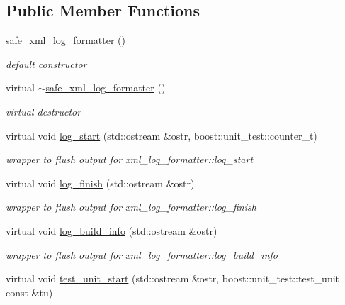 \subsection*{Public Member Functions}
\begin{DoxyCompactItemize}
\item 
\hyperlink{classpion_1_1test_1_1safe__xml__log__formatter_a239efc65e6d0c1f14aae16edc8867664}{safe\-\_\-xml\-\_\-log\-\_\-formatter} ()
\begin{DoxyCompactList}\small\item\em default constructor \end{DoxyCompactList}\item 
virtual \hyperlink{classpion_1_1test_1_1safe__xml__log__formatter_a33953784f10be2a896f44ea81a083a7d}{$\sim$safe\-\_\-xml\-\_\-log\-\_\-formatter} ()
\begin{DoxyCompactList}\small\item\em virtual destructor \end{DoxyCompactList}\item 
virtual void \hyperlink{classpion_1_1test_1_1safe__xml__log__formatter_ad5ecf157f05d08b7a7028c8aeba9b0d7}{log\-\_\-start} (std\-::ostream \&ostr, boost\-::unit\-\_\-test\-::counter\-\_\-t)
\begin{DoxyCompactList}\small\item\em wrapper to flush output for xml\-\_\-log\-\_\-formatter\-::log\-\_\-start \end{DoxyCompactList}\item 
virtual void \hyperlink{classpion_1_1test_1_1safe__xml__log__formatter_ab84589991d45d0301487dde76c748cb2}{log\-\_\-finish} (std\-::ostream \&ostr)
\begin{DoxyCompactList}\small\item\em wrapper to flush output for xml\-\_\-log\-\_\-formatter\-::log\-\_\-finish \end{DoxyCompactList}\item 
virtual void \hyperlink{classpion_1_1test_1_1safe__xml__log__formatter_ac97db50c4d84d7c94145fe18a6ba9223}{log\-\_\-build\-\_\-info} (std\-::ostream \&ostr)
\begin{DoxyCompactList}\small\item\em wrapper to flush output for xml\-\_\-log\-\_\-formatter\-::log\-\_\-build\-\_\-info \end{DoxyCompactList}\item 
virtual void \hyperlink{classpion_1_1test_1_1safe__xml__log__formatter_ab7896861850e8f45508dc4872d860554}{test\-\_\-unit\-\_\-start} (std\-::ostream \&ostr, boost\-::unit\-\_\-test\-::test\-\_\-unit const \&tu)

\end{DoxyCompactItemize}

